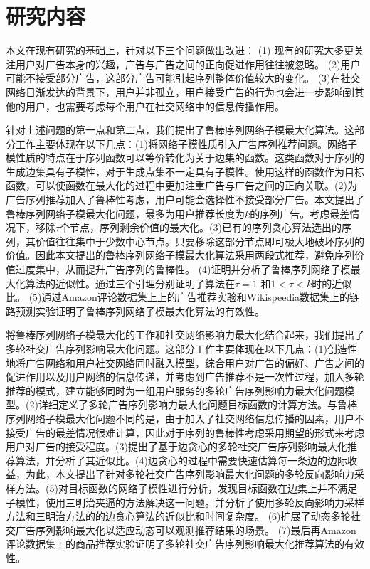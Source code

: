\section{研究内容}

本文在现有研究的基础上，针对以下三个问题做出改进：
(1) 现有的研究大多更关注用户对广告本身的兴趣，广告与广告之间的正向促进作用往往被忽略。
(2)用户可能不接受部分广告，这部分广告可能引起序列整体价值较大的变化。
(3)在社交网络日渐发达的背景下，用户并非孤立，用户接受广告的行为也会进一步影响到其他的用户，也需要考虑每个用户在社交网络中的信息传播作用。

针对上述问题的第一点和第二点，我们提出了鲁棒序列网络子模最大化算法。这部分工作主要体现在以下几点：(1)将网络子模性质引入广告序列推荐问题。网络子模性质的特点在于序列函数可以等价转化为关于边集的函数。这类函数对于序列的生成边集具有子模性，对于生成点集不一定具有子模性。使用这样的函数作为目标函数，可以使函数在最大化的过程中更加注重广告与广告之间的正向关联。(2)为广告序列推荐加入了鲁棒性考虑，用户可能会选择性不接受部分广告。本文提出了鲁棒序列网络子模最大化问题，最多为用户推荐长度为$k$的序列广告。考虑最差情况下，移除$\tau$个节点，序列剩余价值的最大化。(3)已有的序列贪心算法\cite{tschiatschek2017selecting,mitrovic2018submodularity}选出的序列，其价值往往集中于少数中心节点。只要移除这部分节点即可极大地破坏序列的价值。因此本文提出的鲁棒序列网络子模最大化算法采用两段式推荐，避免序列价值过度集中，从而提升广告序列的鲁棒性。
(4)证明并分析了鲁棒序列网络子模最大化算法的近似性。通过三个引理分别证明了算法在$\tau = 1$ 和$1< \tau < k$时的近似比。
(5)通过Amazon评论数据集上\cite{ni2019justifying}上的广告推荐实验和Wikispeedia数据集\cite{west2009wikispeedia}上的链路预测实验证明了鲁棒序列网络子模最大化算法的有效性。

将鲁棒序列网络子模最大化的工作和社交网络影响力最大化结合起来，我们提出了多轮社交广告序列影响最大化问题。这部分工作主要体现在以下几点：(1)创造性地将广告网络和用户社交网络同时融入模型，综合用户对广告的偏好、广告之间的促进作用以及用户网络的信息传递，并考虑到广告推荐不是一次性过程，加入多轮推荐的模式，建立能够同时为一组用户服务的多轮广告序列影响力最大化问题模型。(2)详细定义了多轮广告序列影响力最大化问题目标函数的计算方法。与鲁棒序列网络子模最大化问题不同的是，由于加入了社交网络信息传播的因素，用户不接受广告的最差情况很难计算，因此对于序列的鲁棒性考虑采用期望的形式来考虑用户对广告的接受程度。(3)提出了基于边贪心的多轮社交广告序列影响最大化推荐算法，并分析了其近似比。(4)边贪心的过程中需要快速估算每一条边的边际收益，为此，本文提出了针对多轮社交广告序列影响最大化问题的多轮反向影响力采样方法。(5)对目标函数的网络子模性进行分析，发现目标函数在边集上并不满足子模性，使用三明治夹逼的方法解决这一问题。并分析了使用多轮反向影响力采样方法和三明治方法的的边贪心算法的近似比和时间复杂度。
(6)扩展了动态多轮社交广告序列影响最大化以适应动态可以观测推荐结果的场景。
(7)最后再Amazon评论数据集\cite{amazon24}上的商品推荐实验证明了多轮社交广告序列影响最大化推荐算法的有效性。

